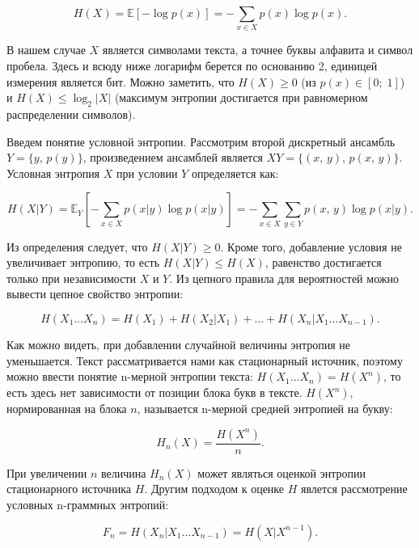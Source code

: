\documentclass[a4paper,12pt]{article}
\begin{document}
	\begin{equation}\label{key}
		H(X) = 
		\mathbb{E}\left[-\log p(x)\right] = 
		- \sum\limits_{x\in X} p(x) \log p(x).
	\end{equation}

	В нашем случае $X$ является символами текста, а точнее буквы алфавита и символ пробела. Здесь и всюду ниже логарифм берется по основанию 2, единицей измерения является бит. Можно заметить, что $ H(X) \ge 0 $ (из $ p(x) \in [0;\; 1] $) и $ H(X) \le \log_2 |X|$ (максимум энтропии достигается при равномерном распределении символов).
	
	Введем понятие условной энтропии. Рассмотрим второй дискретный ансамбль $Y = \{y,\,p(y)\}$, произведением ансамблей является $ XY = \{(x,\,y),\,p(x,\,y)\} $. Условная энтропия $X$ при условии $Y$ определяется как:
	
	\begin{equation}\label{key}
		H(X|Y) = 
		\mathbb{E}_Y\left[ -\sum\limits_{x\in X} p(x|y) \log p(x|y) \right] = 
		- \sum\limits_{x\in X} \sum\limits_{y\in Y} p(x,\,y) \log p(x|y).
	\end{equation}

	Из определения следует, что $ H(X|Y) \ge 0 $. Кроме того, добавление условия не увеличивает энтропию, то есть $ H(X|Y) \le H(X) $, равенство достигается только при независимости $ X $ и $Y$. Из цепного правила для вероятностей можно вывести цепное свойство энтропии:
	
	\begin{equation}\label{eq:Hchain}
		H(X_1...X_n) = H(X_1) + H(X_2 | X_1) + ... + H(X_n|X_1...X_{n-1}).
	\end{equation}

	Как можно видеть, при добавлении случайной величины энтропия не уменьшается. Текст рассматривается нами как стационарный источник, поэтому можно ввести понятие n-мерной энтропии текста: $ H(X_1...X_n) = H(X^n) $, то есть здесь нет зависимости от позиции блока букв в тексте. $ H(X^n) $, нормированная на блока $ n $, называется n-мерной средней энтропией на букву:  
	
	\begin{equation}\label{key}
		H_n(X) = \frac{H(X^n)}{n}.
	\end{equation}
	
	При увеличении $ n $ величина $ H_n(X) $ может являться оценкой энтропии стационарного источника $ H $. Другим подходом к оценке $ H $ явлется рассмотрение условных n-граммных энтропий:
	
	\begin{equation}\label{key}
		F_n = H(X_n|X_1...X_{n-1}) = H(X|X^{n-1}).
	\end{equation}
\end{document}
